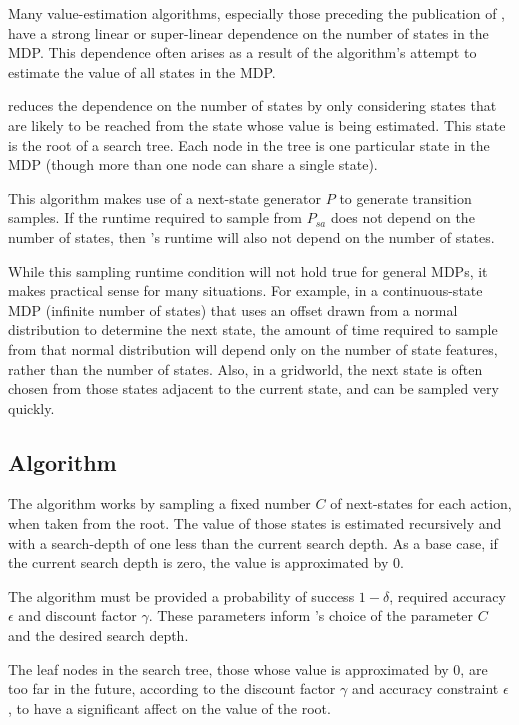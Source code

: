 Many value-estimation algorithms, especially those preceding the publication of , have a strong linear or super-linear dependence on the number of states in the MDP. This dependence often arises as a result of the algorithm's attempt to estimate the value of all states in the MDP.


 reduces the dependence on the number of states by only considering states that are likely to be reached from the state whose value is being estimated. This state is the root of a search tree. Each node in the tree is one particular state in the MDP (though more than one node can share a single state).

This algorithm makes use of a next-state generator $P$ to generate transition samples. If the runtime required to sample from $P_{sa}$ does not depend on the number of states, then 's runtime will also not depend on the number of states.

While this sampling runtime condition will not hold true for general MDPs, it makes practical sense for many situations. For example, in a continuous-state MDP (infinite number of states) that uses an offset drawn from a normal distribution to determine the next state, the amount of time required to sample from that normal distribution will depend only on the number of state features, rather than the number of states. Also, in a gridworld, the next state is often chosen from those states adjacent to the current state, and can be sampled very quickly.

\subsection{Algorithm}


The  algorithm works by sampling a fixed number $C$ of next-states for each action, when taken from the root. The value of those states is estimated recursively and with a search-depth of one less than the current search depth. As a base case, if the current search depth is zero, the value is approximated by $0$.

The algorithm must be provided a probability of success $1-\delta$, required accuracy $\epsilon$ and discount factor $\gamma$. These parameters inform 's choice of the parameter $C$ and the desired search depth.

The leaf nodes in the search tree, those whose value is approximated by $0$, are too far in the future, according to the discount factor $\gamma$ and accuracy constraint $\epsilon$, to have a significant affect on the value of the root.

